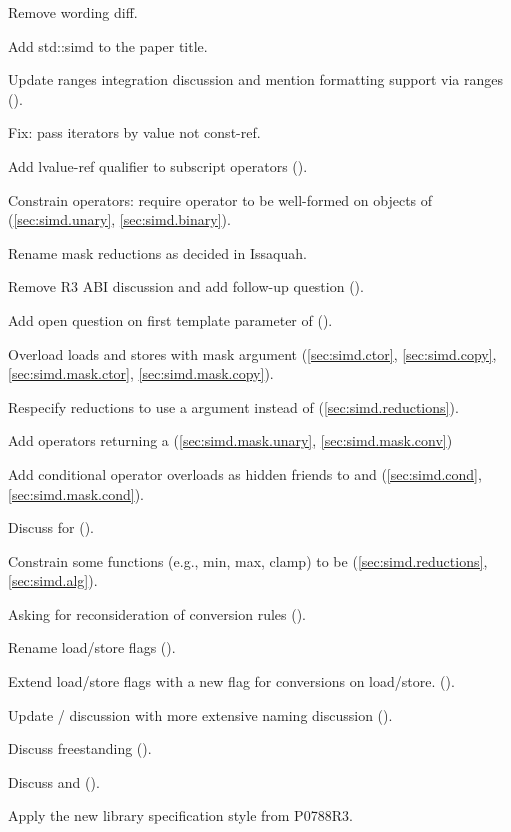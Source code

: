 \begin{revision}
\item Remove wording diff.
\item Add std::simd to the paper title.
\item Update ranges integration discussion and mention formatting support via
  ranges ().
\item Fix: pass iterators by value not const-ref.
\item Add lvalue-ref qualifier to subscript operators ().
\item Constrain  operators: require operator to be well-formed on objects of  (\ref{sec:simd.unary}, \ref{sec:simd.binary}).
\item Rename mask reductions as decided in Issaquah.
\item Remove R3 ABI discussion and add follow-up question ().
\item Add open question on first template parameter of  ().
\item Overload loads and stores with mask argument (\ref{sec:simd.ctor}, \ref{sec:simd.copy}, \ref{sec:simd.mask.ctor}, \ref{sec:simd.mask.copy}).
\item Respecify \simd reductions to use a \mask argument instead of  (\ref{sec:simd.reductions}).
\item Add \mask operators returning a \simd (\ref{sec:simd.mask.unary}, \ref{sec:simd.mask.conv})
\item Add conditional operator overloads as hidden friends to \simd and \mask
  (\ref{sec:simd.cond}, \ref{sec:simd.mask.cond}).
\item Discuss \std{} for \simd ().
\item Constrain some functions (e.g., min, max, clamp) to be  (\ref{sec:simd.reductions}, \ref{sec:simd.alg}).
\item Asking for reconsideration of conversion rules ().
\item Rename load/store flags ().
\item Extend load/store flags with a new flag for conversions on load/store. ().
\item Update / discussion with more extensive naming discussion ().
\item Discuss freestanding \simd ().
\item Discuss  and  ().
\item Apply the new library specification style from P0788R3.
\end{revision}

